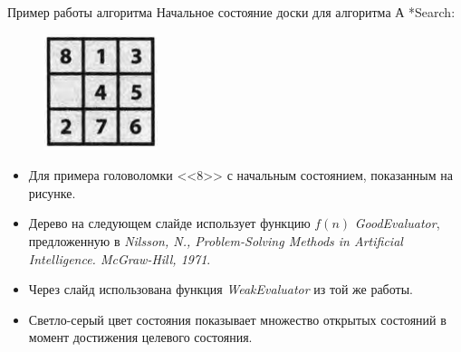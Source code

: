 \documentclass{beamer}
\begin{document}
\begin{frame}{Пример работы алгоритма}
Начальное состояние доски для алгоритма А *Search:
\begin{figure}[h]
\centering
\includegraphics[scale=0.6]{images/lec06-pic10.png}
\end{figure}
\begin{itemize}
\item Для примера головоломки <<8>> с начальным состоянием, показанным на рисунке.
\item Дерево на следующем слайде использует функцию $f(n)$ \textit{GoodEvaluator}, предложенную в \textit{Nilsson, N., Problem-Solving Methods in Artificial Intelligence. McGraw-Hill, 1971}. 
\item Через слайд использована функция \textit{WeakEvaluator} из той же работы. 
\item Светло-серый цвет состояния показывает множество открытых состояний в момент достижения целевого состояния.
\end{itemize}
\end{frame}
\end{document}
